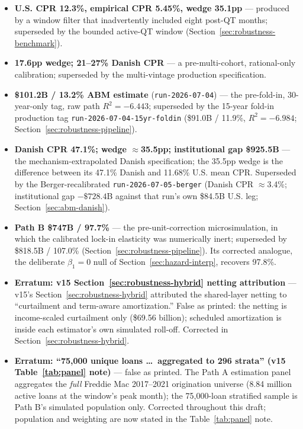 \documentclass[12pt]{article}
\begin{document}
\begingroup\sloppy
\begin{itemize}
\item \textbf{U.S. CPR 12.3\%, empirical CPR 5.45\%, wedge 35.1pp} --- produced by a window filter that inadvertently included eight post-QT months; superseded by the bounded active-QT window (Section~\ref{sec:robustness-benchmark}).
\item \textbf{17.6pp wedge; 21--27\% Danish CPR} --- a pre-multi-cohort, rational-only calibration; superseded by the multi-vintage production specification.
\item \textbf{\$101.2B / 13.2\% ABM estimate} (\texttt{run-2026-07-04}) --- the pre-fold-in, 30-year-only tag, raw path $R^2 = -6.443$; superseded by the 15-year fold-in production tag \texttt{run-2026-07-04-15yr-foldin} (\$91.0B / 11.9\%, $R^2 = -6.984$; Section~\ref{sec:robustness-pipeline}).
\item \textbf{Danish CPR 47.1\%; wedge $\approx$35.5pp; institutional gap \$925.5B} --- the mechanism-extrapolated Danish specification; the 35.5pp wedge is the difference between its 47.1\% Danish and 11.68\% U.S. mean CPR. Superseded by the Berger-recalibrated \texttt{run-2026-07-05-berger} (Danish CPR $\approx$3.4\%; institutional gap $-\$728.4$B against that run's own \$84.5B U.S. leg; Section~\ref{sec:abm-danish}).
\item \textbf{Path B \$747B / 97.7\%} --- the pre-unit-correction microsimulation, in which the calibrated lock-in elasticity was numerically inert; superseded by \$818.5B / 107.0\% (Section~\ref{sec:robustness-pipeline}). Its corrected analogue, the deliberate $\beta_1 = 0$ null of Section~\ref{sec:hazard-interp}, recovers 97.8\%.
\item \textbf{Erratum: v15 Section~\ref{sec:robustness-hybrid} netting attribution} --- v15's Section~\ref{sec:robustness-hybrid} attributed the shared-layer netting to ``curtailment and term-aware amortization.'' False as printed: the netting is income-scaled curtailment only (\$69.56 billion); scheduled amortization is inside each estimator's own simulated roll-off. Corrected in Section~\ref{sec:robustness-hybrid}.
\item \textbf{Erratum: ``75,000 unique loans \ldots\ aggregated to 296 strata'' (v15 Table~\ref{tab:panel} note)} --- false as printed. The Path A estimation panel aggregates the \emph{full} Freddie Mac 2017--2021 origination universe (8.84 million active loans at the window's peak month); the 75,000-loan stratified sample is Path B's simulated population only. Corrected throughout this draft; population and weighting are now stated in the Table~\ref{tab:panel} note.

\end{itemize}
\end{document}
